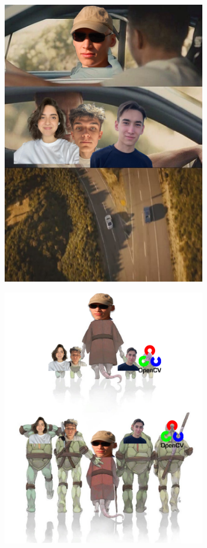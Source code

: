 \begin{figure}[ht!]
    \centering
    \includegraphics[width=0.8\textwidth]{images/image 1.png}
    \label{img:fast}
\end{figure} 

\begin{figure}[ht!]
    \centering
    \includegraphics[width=0.8\textwidth]{images/Component 1.png}
    \label{img:turtles}
\end{figure} 